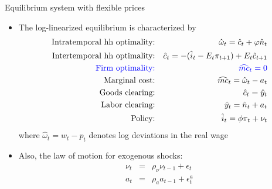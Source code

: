 \documentclass[9pt,xcolor={dvipsnames}]{beamer}
\newcommand{\bit}{\begin{itemize}}
\newcommand{\eit}{\end{itemize}}
\newcommand{\bc}{\color{blue}}
\begin{document}
\begin{frame}{Equilibrium system with flexible prices}

\bit
\setlength\itemsep{1.5em}
\item The log-linearized equilibrium is characterized by
\begin{eqnarray}
\text{Intratemporal hh optimality:} && \hat \omega_t = \hat c_t + \varphi \hat n_t  \nonumber \\
\text{Intertemporal hh optimality:} && \hat c_t =  - (\hat i_t - E_t \pi_{t+1}) + E_t \hat c_{t+1}  \nonumber \\
\text{\bc Firm optimality:} && {\bc \widehat{mc}_t = 0} \nonumber \\
\text{Marginal cost:} && \widehat{mc}_t = \hat \omega_t - a_t \nonumber \\
\text{Goods clearing:} && \hat c_t = \hat y_t \nonumber \\
\text{Labor clearing:} && \hat y_t = \hat n_t + a_t \nonumber \\
\text{Policy:} && \hat i_t = \phi \pi_t + \nu_t \nonumber 
\end{eqnarray}
where $\hat \omega_t = \hat w_t-p_t$ denotes log deviations in the real wage

\item Also, the law of motion for exogenous shocks:
\begin{eqnarray}
\nu_t &=& \rho_{\nu} \nu_{t-1} + \epsilon_t \nonumber \\
a_t &=& \rho_a a_{t-1} + \epsilon^a_t \nonumber
\end{eqnarray}

\eit

\end{frame}
\end{document}
